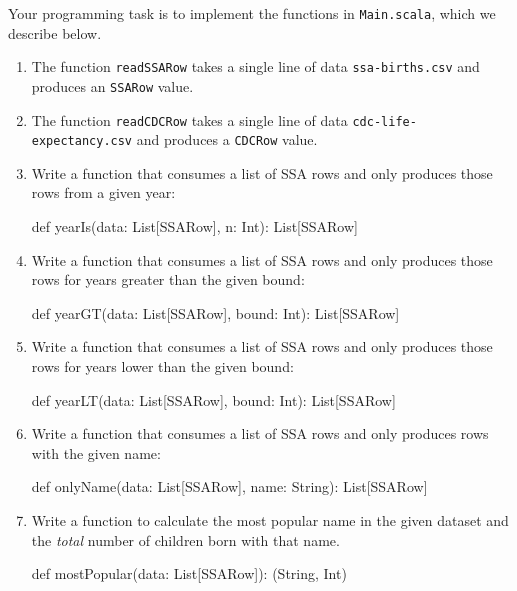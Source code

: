 \documentclass[9pt]{extbook}
\begin{document}
Your programming task is to implement the functions in \texttt{Main.scala},
which we describe below.

\begin{enumerate}

  \item The function \lstinline|readSSARow| takes a single line of data 
  \texttt{ssa-births.csv} and produces an \lstinline|SSARow| value.

  \item The function \lstinline|readCDCRow| takes a single line of data 
  \texttt{cdc-life-expectancy.csv} and produces a \lstinline|CDCRow| value.

  \item Write a function that consumes a list of SSA rows and only produces
  those rows from a given year:
  \begin{scalacode}
  def yearIs(data: List[SSARow], n: Int): List[SSARow]
  \end{scalacode}

  \item Write a function that consumes a list of SSA rows and only produces
  those rows for years greater than the given bound:
  \begin{scalacode}
  def yearGT(data: List[SSARow], bound: Int): List[SSARow]
  \end{scalacode}

  \item Write a function that consumes a list of SSA rows and only produces
  those rows for years lower than the given bound:
  \begin{scalacode}
  def yearLT(data: List[SSARow], bound: Int): List[SSARow]
  \end{scalacode}

  \item Write a function that consumes a list of SSA rows and only produces
  rows with the given name:
  \begin{scalacode}
  def onlyName(data: List[SSARow], name: String): List[SSARow]
  \end{scalacode}

  \item Write a function to calculate the most popular name in the given dataset
  and the \emph{total} number of children born with that name.

  \begin{scalacode}
  def mostPopular(data: List[SSARow]): (String, Int)
  \end{scalacode}


\end{enumerate}
\end{document}
